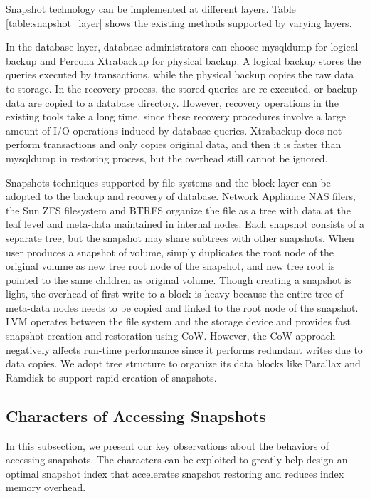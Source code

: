 \documentclass[sigconf, nonacm]{acmart}
\begin{document}
Snapshot technology can be implemented at different layers. Table \ref{table:snapshot_layer}  shows the existing methods supported by varying layers.

In the database layer, database administrators can choose mysqldump \cite{mysqldump} for logical backup and Percona Xtrabackup \cite{xtrabackup} for physical backup. A logical backup stores the queries executed by transactions, while the physical backup copies the raw data to storage. In the recovery process, the stored queries are re-executed, or backup data are copied to a database directory. However, recovery operations in the existing tools take a long time, since these recovery procedures involve a large amount of I/O operations induced by database queries. Xtrabackup does not perform transactions and only copies original data, and then it is faster than mysqldump in restoring process, but the overhead still cannot be ignored. 

Snapshots techniques supported by file systems and the block layer can be adopted to the backup and recovery of database. Network Appliance NAS filers, the Sun ZFS filesystem \cite{rodeh2003zfs} and BTRFS \cite{rodeh2013btrfs} organize the file as a tree with data at the leaf level and meta-data maintained in internal nodes. Each snapshot consists of a separate tree, but the snapshot may share subtrees with other snapshots. When user produces a snapshot of volume, simply duplicates the root node of the original volume as new tree root node of the snapshot, and new tree root is pointed to the same children as original volume.  
Though creating a snapshot is light, the overhead of first write to a block is heavy because the entire tree of meta-data nodes needs to be copied and linked to the root node of the snapshot. 
LVM \cite{hasenstein2001logical} operates between the file system and the storage device and provides fast snapshot creation and restoration using CoW. However, the CoW approach negatively affects run-time performance since it performs redundant writes due to data copies.
We adopt tree structure to organize its data blocks like Parallax \cite{DBLP:conf/eurosys/MeyerACLFHW08} and Ramdisk \cite{nielsen1999use} to support rapid creation of snapshots.

\subsection{Characters of Accessing Snapshots}
\label{Characters}
In this subsection, we present our key observations about the behaviors of accessing snapshots. The characters can be exploited to greatly help design an optimal snapshot index that accelerates snapshot restoring and reduces index memory overhead.
\end{document}
